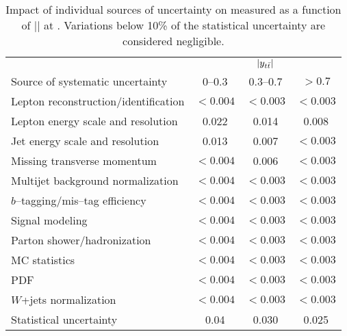 \begin{table}[!htbp]\centering
\begin{tabular}{l c c c}
\toprule
 & \multicolumn{3}{c}{$|y_{t\bar{t}}{}|$}    \\
Source of systematic uncertainty           &    $0$--$0.3$          &        $0.3$--$0.7$     &  $>0.7$   \\
\midrule
Lepton reconstruction/identification              & $<0.004$ & $<0.003$ & $<0.003$ \\
Lepton energy scale and resolution                & 0.022 & 0.014 & 0.008   \\
Jet energy scale and resolution                   & 0.013 & 0.007 & $<0.003$   \\
Missing transverse momentum & $<0.004$ & 0.006 & $<0.003$ \\
Multijet background normalization    & $<0.004$ & $<0.003$ & $<0.003$  \\
$b$--tagging/mis--tag efficiency                & $<0.004$ & $<0.003$ & $<0.003$  \\
Signal modeling                        & $<0.004$ & $<0.003$ & $<0.003$  \\
Parton shower/hadronization             & $<0.004$ & $<0.003$ & $<0.003$  \\
MC statistics                 & $<0.004$ & $<0.003$ & $<0.003$  \\
PDF                                     & $<0.004$ & $<0.003$ & $<0.003$  \\
$W$+jets normalization        & $<0.004$ & $<0.003$ & $<0.003$  \\
\midrule
Statistical uncertainty                 & 0.04       &        0.030      &        0.025     \\
\bottomrule
\end{tabular}
\caption{Impact of individual sources of uncertainty on
  \ac{} measured as a function of |\ytt{}| at \seventev{}. Variations below 10\%
  of the statistical uncertainty are considered negligible.}
\label{table:Systematics_ytt}
\end{table}

